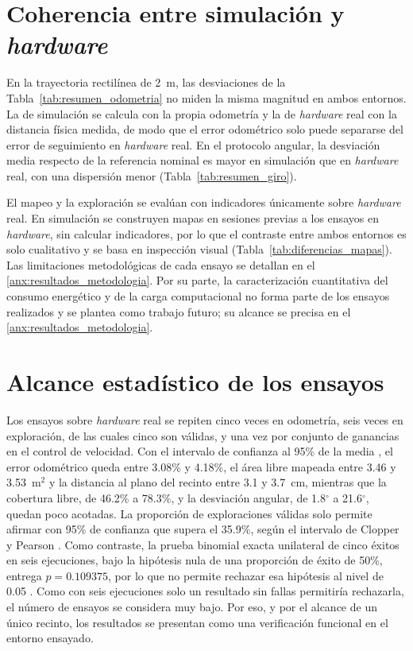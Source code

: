 \section{Coherencia entre simulación y \texorpdfstring{\textit{hardware}}{hardware}}
\label{sec:comparacion_sim_real}

En la trayectoria rectilínea de 2~m, las desviaciones de la
Tabla~\ref{tab:resumen_odometria} no miden la misma magnitud en ambos entornos.
La de simulación se calcula con la propia odometría y la de \textit{hardware} real con
la distancia física medida, de modo que el error odométrico solo puede
separarse del error de seguimiento en \textit{hardware} real. En el protocolo angular,
la desviación media respecto de la referencia nominal es mayor en simulación
que en \textit{hardware} real, con una dispersión menor
(Tabla~\ref{tab:resumen_giro}).

El mapeo y la exploración se evalúan con indicadores únicamente sobre
\textit{hardware} real. En simulación se construyen mapas en sesiones previas a los
ensayos en \textit{hardware}, sin calcular indicadores, por lo que el contraste entre
ambos entornos es solo cualitativo y se basa en inspección visual
(Tabla~\ref{tab:diferencias_mapas}). Las limitaciones metodológicas de cada
ensayo se detallan en el \ref{anx:resultados_metodologia}. Por su parte, la caracterización cuantitativa del consumo energético y de la carga computacional no forma parte de los ensayos realizados y se plantea como trabajo futuro; su alcance se precisa en el \ref{anx:resultados_metodologia}.

\section{Alcance estadístico de los ensayos}
\label{sec:alcance_estadistico}

Los ensayos sobre \textit{hardware} real se repiten cinco veces en odometría,
seis veces en exploración, de las cuales cinco son válidas, y una vez por
conjunto de ganancias en el control de velocidad. Con el intervalo de confianza
al 95\% de la media \citep[Sec.~8.2]{devore2021modern}, el error
odométrico queda entre 3.08\% y 4.18\%, el área libre mapeada entre 3.46 y
3.53~m$^2$ y la distancia al plano del recinto entre 3.1 y 3.7~cm, mientras que
la cobertura libre, de 46.2\% a 78.3\%, y la desviación angular, de
1.8$^\circ$ a 21.6$^\circ$, quedan poco acotadas. La proporción de
exploraciones válidas solo permite afirmar con 95\% de confianza que supera el
35.9\%, según el intervalo de Clopper y Pearson \citep{vincent2024generalizable}.
Como contraste, la prueba binomial exacta unilateral de cinco éxitos en seis
ejecuciones, bajo la hipótesis nula de una proporción de éxito de 50\%, entrega
$p=0.109375$, por lo que no permite rechazar esa hipótesis al nivel de 0.05
\citep[Cap.~9]{devore2021modern}. Como con seis ejecuciones solo un resultado
sin fallas permitiría rechazarla, el número de ensayos se considera muy bajo. Por
eso, y por el alcance de un único recinto, los resultados se presentan como una
verificación funcional en el entorno ensayado.

